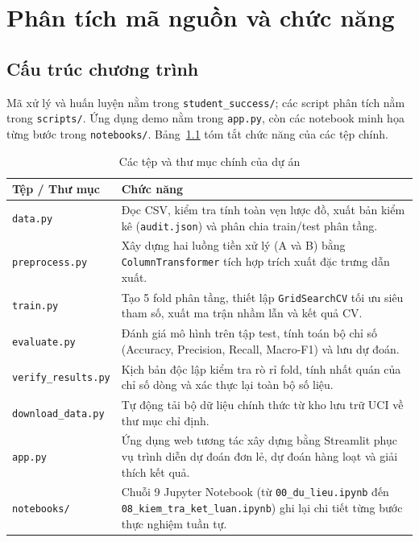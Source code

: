 \chapter{Phân tích mã nguồn và chức năng}

\section{Cấu trúc chương trình}
Mã xử lý và huấn luyện nằm trong \texttt{student\_success/}; các script phân tích nằm trong \texttt{scripts/}. Ứng dụng demo nằm trong \texttt{app.py}, còn các notebook minh họa từng bước trong \texttt{notebooks/}. Bảng~\ref{tab:modules} tóm tắt chức năng của các tệp chính.

\begin{table}[H]\centering\small
\caption{Các tệp và thư mục chính của dự án}\label{tab:modules}
\begin{tabular}{>{\raggedright\arraybackslash}p{4.2cm}>{\raggedright\arraybackslash}p{9.0cm}}\toprule
Tệp / Thư mục & Chức năng\\\midrule
\texttt{data.py} & Đọc CSV, kiểm tra tính toàn vẹn lược đồ, xuất bản kiểm kê (\texttt{audit.json}) và phân chia train/test phân tầng.\\
\texttt{preprocess.py} & Xây dựng hai luồng tiền xử lý (A và B) bằng \texttt{ColumnTransformer} tích hợp trích xuất đặc trưng dẫn xuất.\\
\texttt{train.py} & Tạo 5 fold phân tầng, thiết lập \texttt{GridSearchCV} tối ưu siêu tham số, xuất ma trận nhầm lẫn và kết quả CV.\\
\texttt{evaluate.py} & Đánh giá mô hình trên tập test, tính toán bộ chỉ số (Accuracy, Precision, Recall, Macro-F1) và lưu dự đoán.\\
\texttt{verify\_results.py} & Kịch bản độc lập kiểm tra rò rỉ fold, tính nhất quán của chỉ số dòng và xác thực lại toàn bộ số liệu.\\
\texttt{download\_data.py} & Tự động tải bộ dữ liệu chính thức từ kho lưu trữ UCI về thư mục chỉ định.\\
\texttt{app.py} & Ứng dụng web tương tác xây dựng bằng Streamlit phục vụ trình diễn dự đoán đơn lẻ, dự đoán hàng loạt và giải thích kết quả.\\
\texttt{notebooks/} & Chuỗi 9 Jupyter Notebook (từ \texttt{00\_du\_lieu.ipynb} đến \texttt{08\_kiem\_tra\_ket\_luan.ipynb}) ghi lại chi tiết từng bước thực nghiệm tuần tự.\\\bottomrule
\end{tabular}
\end{table}

